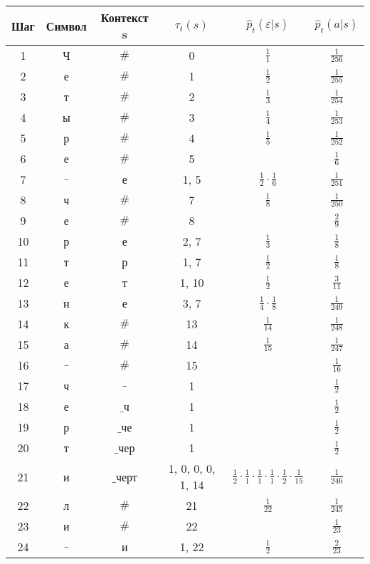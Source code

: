 \begin{tabular}{|c|c|c|c|c|c|}
\hline
Шаг & Символ & Контекст s & $\tau_t(s)$ & $\hat p_t(\varepsilon|s)$ & $\hat p_t(a|s)$\\
\hline
1 & Ч & $\#$ & 0 & $\frac{1}{1}$ & $\frac{1}{256}$\\
\hline
2 & е & $\#$ & 1 & $\frac{1}{2}$ & $\frac{1}{255}$\\
\hline
3 & т & $\#$ & 2 & $\frac{1}{3}$ & $\frac{1}{254}$\\
\hline
4 & ы & $\#$ & 3 & $\frac{1}{4}$ & $\frac{1}{253}$\\
\hline
5 & р & $\#$ & 4 & $\frac{1}{5}$ & $\frac{1}{252}$\\
\hline
6 & е & $\#$ & 5 &  & $\frac{1}{6}$\\
\hline
7 & $\_$ & е & 1, 5 & $\frac{1}{2} \cdot \frac{1}{6}$ & $\frac{1}{251}$\\
\hline
8 & ч & $\#$ & 7 & $\frac{1}{8}$ & $\frac{1}{250}$\\
\hline
9 & е & $\#$ & 8 &  & $\frac{2}{9}$\\
\hline
10 & р & е & 2, 7 & $\frac{1}{3}$ & $\frac{1}{8}$\\
\hline
11 & т & р & 1, 7 & $\frac{1}{2}$ & $\frac{1}{8}$\\
\hline
12 & е & т & 1, 10 & $\frac{1}{2}$ & $\frac{3}{11}$\\
\hline
13 & н & е & 3, 7 & $\frac{1}{4} \cdot \frac{1}{8}$ & $\frac{1}{249}$\\
\hline
14 & к & $\#$ & 13 & $\frac{1}{14}$ & $\frac{1}{248}$\\
\hline
15 & а & $\#$ & 14 & $\frac{1}{15}$ & $\frac{1}{247}$\\
\hline
16 & $\_$ & $\#$ & 15 &  & $\frac{1}{16}$\\
\hline
17 & ч & $\_$ & 1 &  & $\frac{1}{2}$\\
\hline
18 & е & $\_$ч & 1 &  & $\frac{1}{2}$\\
\hline
19 & р & $\_$че & 1 &  & $\frac{1}{2}$\\
\hline
20 & т & $\_$чер & 1 &  & $\frac{1}{2}$\\
\hline
21 & и & $\_$черт & 1, 0, 0, 0, 1, 14 & $\frac{1}{2} \cdot \frac{1}{1} \cdot \frac{1}{1} \cdot \frac{1}{1} \cdot \frac{1}{2} \cdot \frac{1}{15}$ & $\frac{1}{246}$\\
\hline
22 & л & $\#$ & 21 & $\frac{1}{22}$ & $\frac{1}{245}$\\
\hline
23 & и & $\#$ & 22 &  & $\frac{1}{23}$\\
\hline
24 & $\_$ & и & 1, 22 & $\frac{1}{2}$ & $\frac{2}{23}$\\

\end{tabular}
